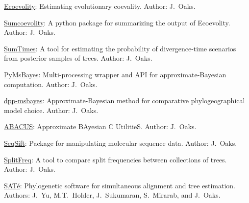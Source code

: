 \myHangIndent
\href{https://github.com/phyletica/ecoevolity}{Ecoevolity}:
    Estimating evolutionary coevality.
    Author: J.\ Oaks.

\myHangIndent
\href{https://github.com/phyletica/sumcoevolity}{Sumcoevolity}:
    A python package for summarizing the output of Ecoevolity.
    Author: J.\ Oaks.

\myHangIndent
\href{https://github.com/phyletica/SumTimes}{SumTimes}:
    A tool for estimating the probability of divergence-time scenarios from
    posterior samples of trees.
    Author: J.\ Oaks.

\myHangIndent
\href{https://github.com/joaks1/PyMsBayes}{PyMsBayes}:
    Multi-processing wrapper and API for approximate-Bayesian
    computation.
    Author: J.\ Oaks.

\myHangIndent
\href{https://github.com/joaks1/dpp-msbayes}{dpp-msbayes}:
    Approximate-Bayesian method for comparative phylogeographical model choice.
    Author: J.\ Oaks.

\myHangIndent
\href{https://github.com/joaks1/abacus}{ABACUS}:
    Approximate BAyesian C UtilitieS.
    Author: J.\ Oaks.

\myHangIndent
\href{https://github.com/joaks1/SeqSift}{SeqSift}:
    Package for manipulating molecular sequence data.
    Author: J.\ Oaks.

\myHangIndent
\href{https://github.com/joaks1/abacus}{SplitFreq}:
    A tool to compare split frequencies between collections of trees.
    Author: J.\ Oaks.

\myHangIndent
\href{http://phylo.bio.ku.edu/software/sate/sate.html}{{SAT}\'{e}}:
    Phylogenetic software for simultaneous alignment and tree estimation.
    Authors: J.\ Yu, M.T.\ Holder, J.\ Sukumaran, S.\ Mirarab, and J.\ Oaks.
